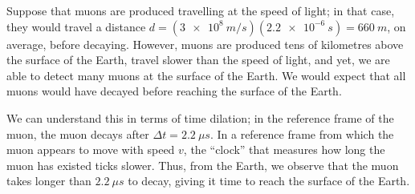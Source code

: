 Suppose that muons are produced travelling at the speed of light; in that case, they would travel a distance $d=(\SI{3e8}{m/s})(\SI{2.2e-6}{s})=\SI{660}{m}$, on average, before decaying. However, muons are produced tens of kilometres above the surface of the Earth, travel slower than the speed of light, and yet, we are able to detect many muons at the surface of the Earth. We would expect that all muons would have decayed before reaching the surface of the Earth.

We can understand this in terms of time dilation; in the reference frame of the muon, the muon decays after $\Delta t=\SI{2.2}{\mu s}$. In a reference frame from which the muon appears to move with speed $v$, the ``clock'' that measures how long the muon has existed ticks slower. Thus, from the Earth, we observe that the muon takes longer than $\SI{2.2}{\mu s}$ to decay, giving it time to reach the surface of the Earth.

